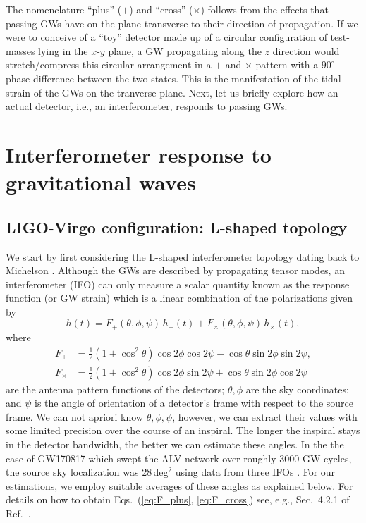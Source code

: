 \documentclass[prd,amsmath,amssymb,aps,floats,amsfonts,notitlepage,superscriptaddress,eqsecnum,nofootinbib,10pt]{revtex4-1}
\newcommand{\f}{\frac}
\newcommand{\be}{\begin{equation}}
\newcommand{\ee}{\end{equation}}
\begin{document}
The nomenclature ``plus'' ($+$) and ``cross'' ($\times$) follows from the effects that passing GWs have on the plane transverse to their direction of propagation.
If we were to conceive of a ``toy'' detector made up of a circular configuration of test-masses lying in the $x$-$y$ plane, a GW propagating along the $z$ direction would stretch/compress this circular arrangement in a $+$ and $\times$ pattern 
with a $90^\circ$ phase difference between the two states.
This is the manifestation of the tidal strain of the GWs on the tranverse plane.
Next, let us briefly explore how an actual detector, i.e., an interferometer, responds to passing GWs.


\section{Interferometer response to gravitational waves}\label{sec:IFO_response}
\subsection{LIGO-Virgo configuration: L-shaped topology}\label{sec:LIGO_topo}
We start by first considering the L-shaped interferometer topology dating back to Michelson \cite{Michelson:1887zz}.
Although the GWs are described by propagating tensor modes, an interferometer (IFO) can only measure a scalar quantity
known as the response function (or GW strain) which is a linear combination of the polarizations given by
%
\be
h(t) = F_+(\theta,\phi,\psi) \,h_+(t)+F_\times(\theta,\phi,\psi)\, h_\times(t) , \label{eq:detector_strain}
\ee
%
where
%
\begin{align}
 F_+ &=\f{1}{2}\left(1+\cos^2\theta\right)\cos2\phi\cos 2\psi-\cos\theta \sin2\phi \sin2\psi \label{eq:F_plus},\\
 F_\times &=\f{1}{2}\left(1+\cos^2\theta\right)\cos2\phi\sin2\psi+\cos\theta \sin2\phi \cos2\psi \label{eq:F_cross}
\end{align}
%
are the antenna pattern functions of the detectors; $\theta,\phi$ are the sky coordinates; and $\psi$ is
the angle of orientation of a detector's frame with respect to the source frame. %
%
We can not apriori know $\theta, \phi,\psi$, however, we can extract their values with some limited precision over the course of an inspiral.
The longer the inspiral stays in the detector bandwidth, the better we can estimate these angles.
In the the case of GW170817 which swept the ALV network over roughly 3000 GW cycles, 
the source sky localization was 28\,deg$^2$ using data from three IFOs \cite{GW170817}. 
For our estimations, we employ suitable averages of these angles as explained below.
For details on how to obtain Eqs.~(\ref{eq:F_plus}, \ref{eq:F_cross}) see, e.g., Sec.~4.2.1 of Ref.~\cite{SchutzLRR}.
\end{document}
